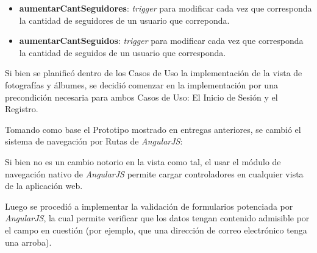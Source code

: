 \documentclass{memoria}
\begin{document}
\begin{enumerate}
\begin{enumerate}
		\begin{itemize}
		\item \textbf{aumentarCantSeguidores}: \textsl{trigger} para modificar cada vez que corresponda la cantidad de seguidores de un usuario que correponda.
		\item \textbf{aumentarCantSeguidos}: \textsl{trigger} para modificar cada vez que corresponda la cantidad de seguidos de un usuario que corresponda.
		\end{itemize}
	\end{enumerate}

\end{enumerate}


Si bien se planificó dentro de los Casos de Uso la implementación de la vista de fotografías y álbumes, se decidió comenzar en la implementación por una precondición necesaria para ambos Casos de Uso: El Inicio de Sesión y el Registro.

Tomando como base el Prototipo mostrado en entregas anteriores, se cambió el sistema de navegación por Rutas de \textsl{AngularJS}:


Si bien no es un cambio notorio en la vista como tal, el usar el módulo de navegación nativo de \textsl{AngularJS} permite cargar controladores en cualquier vista de la aplicación web.

Luego se procedió a implementar la validación de formularios potenciada por \textsl{AngularJS}, la cual permite verificar que los datos tengan contenido admisible por el campo en cuestión (por ejemplo, que una dirección de correo electrónico tenga una arroba).
\end{document}
